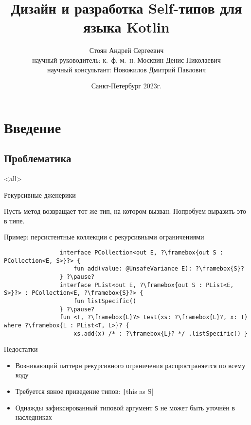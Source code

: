 \documentclass[aspectratio=169,usenames,dvipsnames]{beamer}
\author[Андрей Стоян]{Стоян Андрей Сергеевич \\ {\footnotesize научный руководитель: к.~ф.-м.~н.} Москвин Денис Николаевич \\ {\footnotesize научный консультант:} Новожилов Дмитрий Павлович}
\institute[ИТМО/SE]{Университет ИТМО\\Разработка программного обеспечения/Software engineering}
\title[Дизайн и разработка Self-типов для языка Kotlin]{Дизайн и разработка Self-типов для языка Kotlin}
\date{Санкт-Петербург 2023г.}
\begin{document}
    \maketitle



    \section{Введение}


    \subsection{Проблематика}

    \mode<all>
    \begin{frame}[fragile]{Рекурсивные дженерики}

        Пусть метод возвращает тот же тип, на котором вызван.
        Попробуем выразить это в типе.

        \begin{block}{Пример: персистентные коллекции с рекурсивными ограничениями}
            \begin{verbatim}
                interface PCollection<out E, ?\framebox{out S : PCollection<E, S>}?> {
                    fun add(value: @UnsafeVariance E): ?\framebox{S}?
                } ?\pause?
                interface PList<out E, ?\framebox{out S : PList<E, S>}?> : PCollection<E, ?\framebox{S}?> {
                    fun listSpecific()
                } ?\pause?
                fun <T, ?\framebox{L}?> test(xs: ?\framebox{L}?, x: T) where ?\framebox{L : PList<T, L>}? {
                    xs.add(x) /* : ?\framebox{L}? */ .listSpecific() }
            \end{verbatim}
        \end{block}

        \pause

        \begin{block}{Недостатки}
            \begin{itemize}
                \item Возникающий паттерн рекурсивного ограничения распространяется по всему коду
                \item Требуется явное приведение типов: \texttt|this as S|
                \item Однажды зафиксированный типовой аргумент \texttt{S} не может быть уточнён в наследниках
            \end{itemize}
        \end{block}
    \end{frame}
    \mode*
\end{document}
